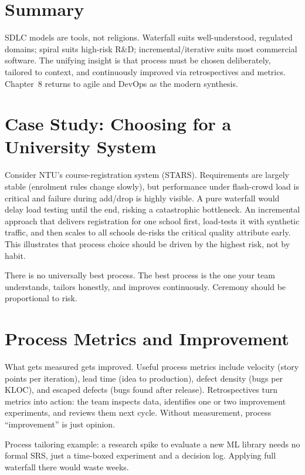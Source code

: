 \section{Summary}

SDLC models are tools, not religions. Waterfall suits well-understood, regulated domains; spiral suits high-risk R\&D; incremental/iterative suits most commercial software. The unifying insight is that process must be chosen deliberately, tailored to context, and continuously improved via retrospectives and metrics. Chapter~8 returns to agile and DevOps as the modern synthesis.


\section{Case Study: Choosing for a University System}

Consider NTU's course-registration system (STARS). Requirements are largely stable (enrolment rules change slowly), but performance under flash-crowd load is critical and failure during add/drop is highly visible. A pure waterfall would delay load testing until the end, risking a catastrophic bottleneck. An incremental approach that delivers registration for one school first, load-tests it with synthetic traffic, and then scales to all schools de-risks the critical quality attribute early. This illustrates that process choice should be driven by the highest risk, not by habit.

\begin{remark}
There is no universally best process. The best process is the one your team understands, tailors honestly, and improves continuously. Ceremony should be proportional to risk.
\end{remark}


\section{Process Metrics and Improvement}

What gets measured gets improved. Useful process metrics include velocity (story points per iteration), lead time (idea to production), defect density (bugs per KLOC), and escaped defects (bugs found after release). Retrospectives turn metrics into action: the team inspects data, identifies one or two improvement experiments, and reviews them next cycle. Without measurement, process ``improvement'' is just opinion.


\begin{remark}
Process tailoring example: a research spike to evaluate a new ML library needs no formal SRS, just a time-boxed experiment and a decision log. Applying full waterfall there would waste weeks.
\end{remark}

